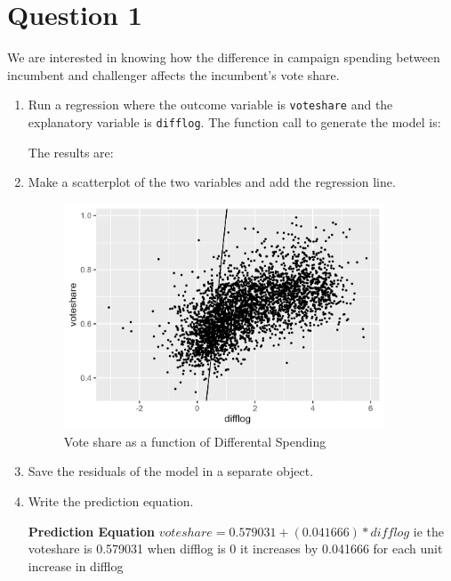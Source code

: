 \documentclass[12pt,letterpaper]{article}
\begin{document}
\section*{Question 1}
\noindent We are interested in knowing how the difference in campaign spending between incumbent and challenger affects the incumbent's vote share. 
	\begin{enumerate}
		\item Run a regression where the outcome variable is \texttt{voteshare} and the explanatory variable is \texttt{difflog}.	
		  The function call to generate the model is:
	
	The results are: 
    
		\item Make a scatterplot of the two variables and add the regression line. 	
	\begin{figure}
		  \includegraphics[width=0.9\textwidth]{Graphics/vote_spend.png}
		  \caption{Vote share as a function of Differental Spending}
		  \label{fig:vote_spend}
	\end{figure}
		
		\item Save the residuals of the model in a separate object.	

	

		\item Write the prediction equation.
		
    \textbf{Prediction Equation} 
    $voteshare = 0.579031 + (0.041666) * difflog$
    ie the voteshare is 0.579031 when difflog is 0
    it increases by 0.041666 for each unit increase in difflog

	\end{enumerate}
\end{document}
